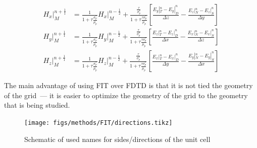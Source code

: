             \begin{align}
                H_x|_M^{n+\frac{1}{1}} &= \frac{1}{1 + \tau\frac{\sigma_p^*}{\mu_p}}H_x|_M^{n-\frac{1}{2}} + \frac{\frac{\tau}{\sigma_p^*}}{1+\tau\frac{\tau\sigma_p^*}{\mu_p}}\left[ \frac{E_y|_T^n - E_y|_D^n}{\Delta z} - \frac{E_z|_N^n - E_z|_S^n}{\Delta y}\right]\\
                H_y|_M^{n+\frac{1}{1}} &= \frac{1}{1 + \tau\frac{\sigma_p^*}{\mu_p}}H_y|_M^{n-\frac{1}{2}} + \frac{\frac{\tau}{\sigma_p^*}}{1+\tau\frac{\tau\sigma_p^*}{\mu_p}}\left[\frac{E_z|_T^n - E_z|_D^n}{\Delta x} - \frac{E_x|_N^n - E_x|_S^n}{\Delta z}\right]\\
                H_z|_M^{n+\frac{1}{1}} &= \frac{1}{1 + \tau\frac{\sigma_p^*}{\mu_p}}H_z|_M^{n-\frac{1}{2}} + \frac{\frac{\tau}{\sigma_p^*}}{1+\tau\frac{\tau\sigma_p^*}{\mu_p}}\left[\frac{E_x|_T^n - E_x|_D^n}{\Delta y} - \frac{E_y|_N^n - E_y|_S^n}{\Delta x}\right]
            \end{align}

            The main advantage of using FIT over FDTD is that it is not tied the geometry of the grid~--- it is easier to optimize the geometry of the grid to the
            geometry that is being studied.


            \begin{figure}
                \centering
                \texttt{[image: figs/methods/FIT/directions.tikz]}
                \caption{Schematic of used names for sides/directions of the unit cell}
                \label{fig:Dir_Int}
            \end{figure}
\clearpage
